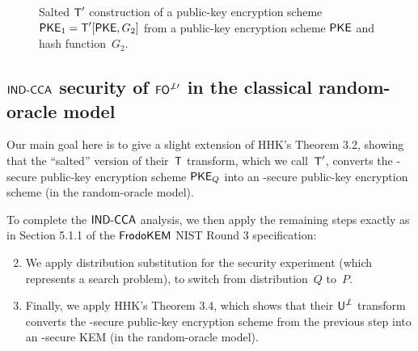 \documentclass{iacrcc}
\begin{document}
\begin{figure}[h]
\centering
{}
\caption{Salted $\textsf{\upshape\mdseries T}'$ construction of a public-key encryption scheme $\textsf{\upshape\mdseries PKE}_1=\textsf{\upshape\mdseries T}'[\textsf{\upshape\mdseries PKE}, G_2]$ from a public-key encryption scheme $\textsf{\upshape\mdseries PKE}$ and hash function~$G_2$.}
\label{fig:T'}
\end{figure}

\subsection{$\textsf{\upshape\mdseries IND-CCA}$ security of $\textsf{\upshape\mdseries FO}^{\not\perp\prime}$ in the classical random-oracle model}\label{sec:security:ROM}

Our main goal here is to give a slight extension of HHK's Theorem 3.2, showing that the ``salted'' version of their~$\textsf{\upshape\mdseries T}$ transform, which we call~$\textsf{\upshape\mdseries T}'$, converts the \INDCPA-secure public-key encryption scheme $\textsf{\upshape\mdseries PKE}_{Q}$ into an \OWPCA-secure public-key encryption scheme (in the random-oracle model).

To complete the $\textsf{\upshape\mdseries IND-CCA}$ analysis, we then apply the remaining steps exactly as in Section 5.1.1 of the $\textsf{\upshape\mdseries FrodoKEM}$ NIST Round 3 specification:
\begin{enumerate}
\setcounter{enumi}{1}
\item We apply distribution substitution for the \OWPCA security experiment (which represents a search problem), to switch from distribution~$Q$ to~$P$.
\item Finally, we apply HHK's Theorem 3.4, which shows that their $\textsf{\upshape\mdseries U}^{\not\perp}$ transform converts the \OWPCA-secure public-key encryption scheme from the previous step into an \INDCCA-secure KEM (in the random-oracle model).
\end{enumerate}
\end{document}

